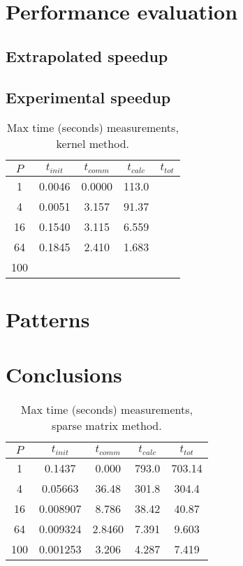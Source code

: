 \documentclass[a4paper,11pt]{article}
\begin{document}
\section*{Performance evaluation}
\subsection*{Extrapolated speedup}
\subsection*{Experimental speedup}
\begin{table}[h]
\def\arraystretch{1.2}
\begin{center}
\caption{Max time (seconds) measurements, kernel method.}
\label{tab:kernal}
\vspace{0.3cm}
\begin{tabular}{| c | c | c | c | c |}
\hline
$P$ & $t_{init}$ & $t_{comm}$ & $t_{calc}$ & $t_{tot}$ \\
\hline
1 & 0.0046 & 0.0000 &113.0 &\\
\hline
4 & 0.0051& 3.157 & 91.37 &\\
\hline
16 & 0.1540 & 3.115 & 6.559 &\\
\hline
64 & 0.1845 & 2.410 &1.683 &\\
\hline
100 & & &  &\\
\hline
\end{tabular}
\end{center}
\end{table}

\section*{Patterns}
\section*{Conclusions}

\begin{table}[h]
\def\arraystretch{1.2}
\begin{center}
\caption{Max time (seconds) measurements, sparse matrix method.}
\label{tab:matrix}
\vspace{0.3cm}
\begin{tabular}{| c | c | c | c | c |}
\hline
$P$ & $t_{init}$ & $t_{comm}$ & $t_{calc}$ & $t_{tot}$ \\
\hline
1 & 0.1437 &  0.000 & 793.0 & 703.14\\
\hline
4 & 0.05663 & 36.48 & 301.8 & 304.4\\
\hline
16 & 0.008907 & 8.786 & 38.42 & 40.87\\
\hline
64 & 0.009324 & 2.8460 & 7.391 & 9.603\\
\hline
100 & 0.001253 & 3.206 & 4.287 & 7.419\\
\hline
\end{tabular}
\end{center}
\end{table}
\end{document}
